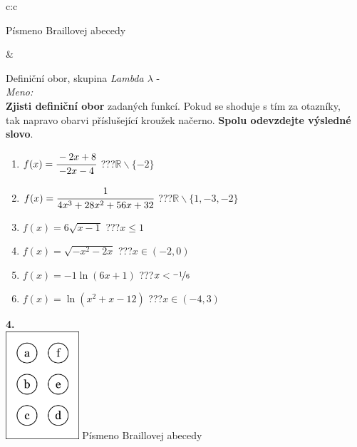 \documentclass[10pt]{report}
\begin{document}
\begin{tabular}{c:c}
\begin{minipage}[c][99mm][t]{0.49\linewidth}
\begin{center}
\begin{minipage}{0.20\linewidth}
\begin{center}
{\small Písmeno Braillovej abecedy}
\end{center}
\end{minipage}
\end{center}
\end{minipage}
&
\begin{minipage}[c][99mm][t]{0.49\linewidth}
\begin{center}
\vspace{7mm}
{\huge Definiční obor, skupina \textit{Lambda $\lambda$} -}\\[4.5mm]
\textit{Meno:}\phantom{xxxxxxxxxxxxxxxxxxxxxxxxxxxxxxxxxxxxxxxxxxxxxxxxxxxxxxxxxxxxxxxxx}\\[3.5mm]
\textbf{Zjisti definiční obor} zadaných funkcí. Pokud se shoduje s tím za otazníky,\\tak napravo obarvi příslušející kroužek načerno. \textbf{Spolu odevzdejte výsledné slovo}.\\[3mm]
\begin{minipage}{0.77\linewidth}
\begin{center}
\begin{varwidth}{\textwidth}
\begin{enumerate}
\normalsize
\item $f(x)=\cfrac{-2x+8}{-2x-4}$\quad \dotfill\; ???\;\dotfill \quad $\mathbb{R}\smallsetminus\{-2\}$
\item $f(x)=\cfrac{1}{4x^3+28x^2+56x+32}$\quad \dotfill\; ???\;\dotfill \quad $\mathbb{R}\smallsetminus\{1,-3,-2\}$
\item $f(x)=6\sqrt{x-1}$\quad \dotfill\; ???\;\dotfill \quad $x\leq1$
\item $f(x)=\sqrt{-x^2-2x}$\quad \dotfill\; ???\;\dotfill \quad $x\in(-2 , 0)$
\item $f(x)=-1\ln{(6x+1)}$\quad \dotfill\; ???\;\dotfill \quad $x<\nicefrac{-1}{6}$
\item $f(x)=\ln{(x^2+x-12)}$\quad \dotfill\; ???\;\dotfill \quad $x\in(-4 , 3)$
\end{enumerate}
\end{varwidth}
\end{center}
\end{minipage}
\begin{minipage}{0.20\linewidth}
\begin{center}
{\Huge\bfseries 4.} \\[2mm]
\includegraphics[height=40mm]{../images/braille.png}
{\small Písmeno Braillovej abecedy}
\end{center}
\end{minipage}
\end{center}
\end{minipage}
%
\end{tabular}
\end{document}

